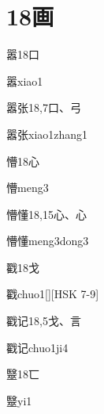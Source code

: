 
\section*{18画}

\begin{Entry}{嚣}{18}{⼝}
  \begin{Phonetics}{嚣}{xiao1}
  \end{Phonetics}
\end{Entry}

\begin{Entry}{嚣张}{18,7}{⼝、⼸}
  \begin{Phonetics}{嚣张}{xiao1zhang1}
  \end{Phonetics}
\end{Entry}

\begin{Entry}{懵}{18}{⼼}
  \begin{Phonetics}{懵}{meng3}
  \end{Phonetics}
\end{Entry}

\begin{Entry}{懵懂}{18,15}{⼼、⼼}
  \begin{Phonetics}{懵懂}{meng3dong3}
  \end{Phonetics}
\end{Entry}

\begin{Entry}{戳}{18}{⼽}
  \begin{Phonetics}{戳}{chuo1}[][HSK 7-9]
  \end{Phonetics}
\end{Entry}

\begin{Entry}{戳记}{18,5}{⼽、⾔}
  \begin{Phonetics}{戳记}{chuo1ji4}
  \end{Phonetics}
\end{Entry}

\begin{Entry}{毉}{18}{⼖}
  \begin{Phonetics}{毉}{yi1}
  \end{Phonetics}
\end{Entry}


